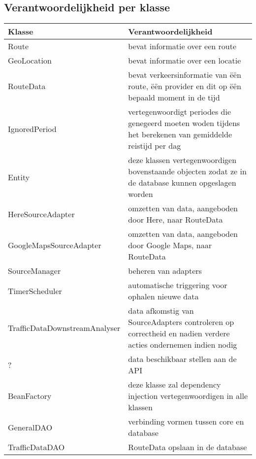 \documentclass[ps,a4paper,oneside]{report}
\begin{document}
\subsection{Verantwoordelijkheid per klasse}
\begin{tabular}{ | l | p{6.5cm}| }
	\hline
	\textbf{Klasse} & \textbf{Verantwoordelijkheid} \\
	\hline
	Route & bevat informatie over een route \\
	\hline
	GeoLocation & bevat informatie over een locatie \\
	\hline
	RouteData & bevat verkeersinformatie van \"e\"en route, \"e\"en provider en dit op \"e\"en bepaald moment in de tijd \\
	\hline
	IgnoredPeriod & vertegenwoordigt periodes die genegeerd moeten woden tijdens het berekenen van gemiddelde reistijd per dag\\
	\hline
	[Object]Entity & deze klassen vertegenwoordigen bovenstaande objecten zodat ze in de database kunnen opgeslagen worden\\
	\hline
	HereSourceAdapter & omzetten van data, aangeboden door Here, naar RouteData\\	
	\hline
	GoogleMapsSourceAdapter & omzetten van data, aangeboden door Google Maps, naar RouteData\\	
	\hline
	SourceManager & beheren van adapters\\	
	\hline
	TimerScheduler & automatische triggering voor ophalen nieuwe data\\	
	\hline
	TrafficDataDownstreamAnalyser & data afkomstig van SourceAdapters controleren op correctheid en nadien verdere acties ondernemen indien nodig\\	
	\hline
	? & data beschikbaar stellen aan de API\\	
	\hline
	BeanFactory & deze klasse zal dependency injection vertegenwoordigen in alle klassen \\	
	\hline
	GeneralDAO & verbinding vormen tussen core en database\\	
	\hline
	TrafficDataDAO & RouteData opslaan in de database\\	
	\hline
\end{tabular}
\end{document}
